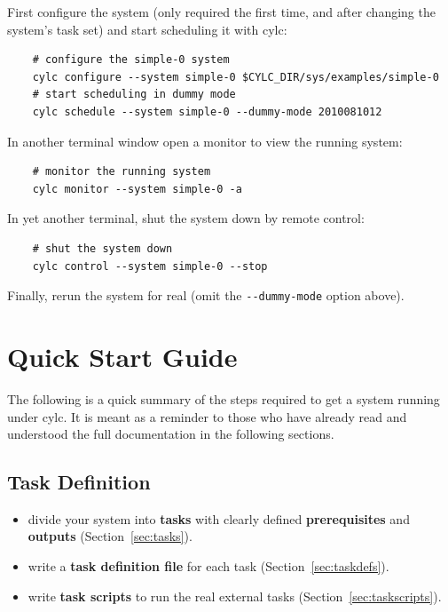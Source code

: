 \documentclass[11pt,a4paper]{article}
\begin{document}
First configure the system (only required the first time, and after
changing the system's task set) and start scheduling it with cylc:

\begin{lstlisting}
    # configure the simple-0 system
    cylc configure --system simple-0 $CYLC_DIR/sys/examples/simple-0
    # start scheduling in dummy mode
    cylc schedule --system simple-0 --dummy-mode 2010081012
\end{lstlisting}

In another terminal window open a monitor to view the running system:

\begin{lstlisting}
    # monitor the running system
    cylc monitor --system simple-0 -a
\end{lstlisting}

In yet another terminal, shut the system down by remote control:

\begin{lstlisting}
    # shut the system down
    cylc control --system simple-0 --stop
\end{lstlisting}

Finally, rerun the system for real (omit the \lstinline{--dummy-mode}
option above).

\pagebreak
\section{Quick Start Guide}

The following is a quick summary of the steps required to get a system
running under cylc. It is meant as a reminder to those who have already
read and understood the full documentation in the following sections.

\subsection{Task Definition}

\begin{itemize}
    \item divide your system into {\bf tasks} with clearly defined 
        {\bf prerequisites} and {\bf outputs} (Section~\ref{sec:tasks}).

    \item write a {\bf task definition file} for each task
        (Section~\ref{sec:taskdefs}).

    \item write {\bf task scripts} to run the real external tasks 
        (Section~\ref{sec:taskscripts}).

\end{itemize}
\end{document}
